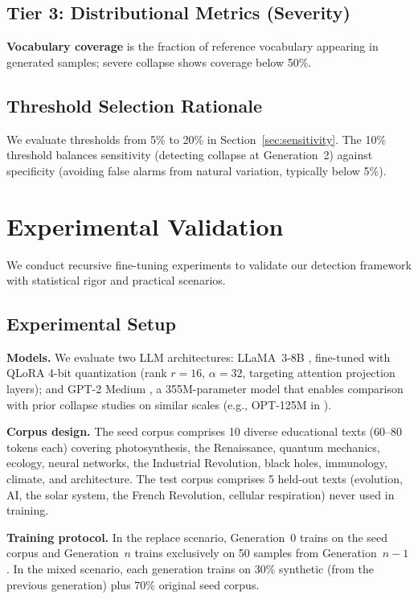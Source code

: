 \documentclass{svproc}
\begin{document}
\subsection{Tier 3: Distributional Metrics (Severity)}
\textbf{Vocabulary coverage} is the fraction of reference vocabulary appearing in
generated samples; severe collapse shows coverage below 50\%.

\subsection{Threshold Selection Rationale}
We evaluate thresholds from 5\% to 20\% in Section~\ref{sec:sensitivity}. The 10\%
threshold balances sensitivity (detecting collapse at Generation~2) against
specificity (avoiding false alarms from natural variation, typically below 5\%).

\section{Experimental Validation}\label{sec:experiments}
We conduct recursive fine-tuning experiments to validate our detection framework
with statistical rigor and practical scenarios.

\subsection{Experimental Setup}
\noindent\textbf{Models.} We evaluate two LLM architectures: LLaMA~3-8B
\cite{meta2024llama3}, fine-tuned with QLoRA 4-bit quantization
\cite{dettmers2023qlora} (rank $r=16$, $\alpha=32$, targeting attention projection
layers); and GPT-2 Medium \cite{radford2019language}, a 355M-parameter model that
enables comparison with prior collapse studies on similar scales (e.g., OPT-125M in
\cite{shumailov2024nature}).

\noindent\textbf{Corpus design.} The seed corpus comprises 10 diverse educational
texts (60--80 tokens each) covering photosynthesis, the Renaissance, quantum
mechanics, ecology, neural networks, the Industrial Revolution, black holes,
immunology, climate, and architecture. The test corpus comprises 5 held-out texts
(evolution, AI, the solar system, the French Revolution, cellular respiration)
never used in training.

\noindent\textbf{Training protocol.} In the replace scenario, Generation~0 trains
on the seed corpus and Generation~$n$ trains exclusively on 50 samples from
Generation~$n-1$. In the mixed scenario, each generation trains on 30\% synthetic
(from the previous generation) plus 70\% original seed corpus.
\end{document}
